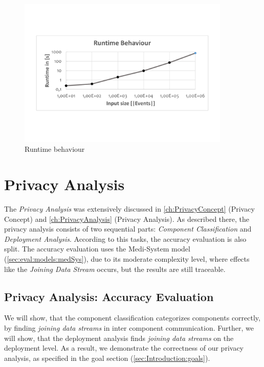 \begin{figure}[h]
	\centering
	\includegraphics[trim = 0mm 40mm 0mm 40mm, clip, width=0.90\textwidth]{graphs/Runtime_Transformation}
	\caption{Runtime behaviour}
	\label{fig:eval:runtime:transformation}
\end{figure}


\section{Privacy Analysis}
\label{sec:Evaluation:privacyanalysis}

The \textit{Privacy Analysis} was extensively discussed in \autoref{ch:PrivacyConcept} (Privacy Concept) and \autoref{ch:PrivacyAnalysis} (Privacy Analysis). As described there, the privacy analysis consists of two sequential parts: \textit{Component Classification} and \textit{Deployment Analysis}. According to this tasks, the accuracy evaluation is also split. The accuracy evaluation uses the Medi-System model (\autoref{sec:eval:models:medSys}), due to its moderate complexity level, where effects like the \textit{Joining Data Stream} occurs, but the results are still traceable.

\subsection{Privacy Analysis: Accuracy Evaluation}

We will show, that the component classification categorizes components correctly, by finding \textit{joining data streams} in inter component communication. Further, we will show, that the deployment analysis finds \textit{joining data streams} on the deployment level. As a result, we demonstrate the correctness of our privacy analysis, as specified in the goal section (\autoref{sec:Introduction:goals}).

